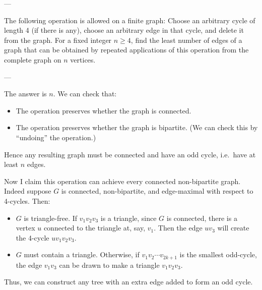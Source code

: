
---

The following operation is allowed on a finite graph: Choose an arbitrary cycle of length 4 (if there is any), choose an arbitrary edge in that cycle, and delete it from the graph. For a fixed integer $n\ge 4$, find the least number of edges of a graph that can be obtained by repeated applications of this operation from the complete graph on $n$ vertices.

---

The answer is $n$. We can check that:
\begin{itemize}
    \item The operation preserves whether the graph is connected.
    \item The operation preserves whether the graph is bipartite. (We can check this by ``undoing'' the operation.)
\end{itemize}
Hence any resulting graph must be connected and have an odd cycle, i.e.\ have at least $n$ edges.

Now I claim this operation can achieve every connected non-bipartite graph. Indeed suppose $G$ is connected, non-bipartite, and edge-maximal with respect to 4-cycles. Then:
\begin{itemize}
    \item $G$ is triangle-free. If $v_1v_2v_3$ is a triangle, since $G$ is connected, there is a vertex $u$ connected to the triangle at, say, $v_1$. Then the edge $uv_3$ will create the 4-cycle $uv_1v_2v_3$.
    \item $G$ must contain a triangle. Otherwise, if $v_1v_2\cdots v_{2k+1}$ is the smallest odd-cycle, the edge $v_1v_3$ can be drawn to make a triangle $v_1v_2v_3$.
\end{itemize}
Thus, we can construct any tree with an extra edge added to form an odd cycle.

